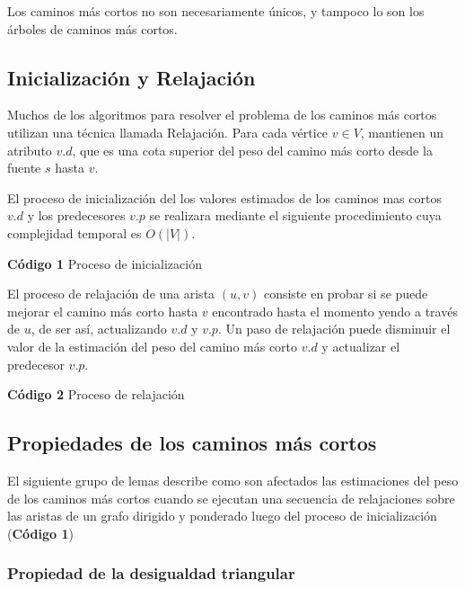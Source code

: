 \documentclass[12pt]{article}
\newcommand{\nl}{\vspace{0.3cm}}
\begin{document}
Los caminos más cortos no son necesariamente únicos, y tampoco lo son los árboles de caminos más cortos.

\subsection{Inicialización y Relajación}

\nl

Muchos de los algoritmos para resolver el problema de los caminos más cortos utilizan una técnica llamada Relajación. Para cada vértice $v \in V$, mantienen un atributo $v.d$, que es una cota superior del peso del camino más corto desde la fuente $s$ hasta $v$.

\nl

El proceso de inicialización del los valores estimados de los caminos mas cortos $v.d$ y los predecesores $v.p$ se realizara mediante el siguiente procedimiento cuya complejidad temporal es $O(|V|)$.

\nl

\textbf{Código 1} Proceso de inicialización



\nl

El proceso de relajación de una arista $(u, v)$ consiste en probar si se puede mejorar el camino más corto hasta $v$ encontrado hasta el momento yendo a través de $u$, de ser así, actualizando $v.d$ y $v.p$. Un paso de relajación puede disminuir el valor de la estimación del peso del camino más corto $v.d$ y actualizar el predecesor $v.p$.

\nl

\textbf{Código 2} Proceso de relajación



\newpage

\subsection{Propiedades de los caminos más cortos}

\nl

El siguiente grupo de lemas describe como son afectados las estimaciones del peso de los caminos más cortos cuando se ejecutan una secuencia de relajaciones sobre las aristas de un grafo dirigido y ponderado luego del proceso de inicialización (\textbf{Código 1})

\subsubsection{Propiedad de la desigualdad triangular}
\end{document}
